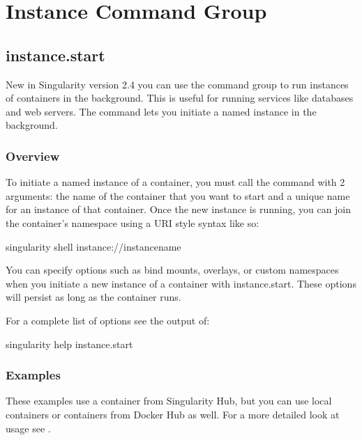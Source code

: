 \documentclass[letterpaper,10pt,english]{sphinxmanual}
\begin{document}
\section{Instance Command Group}
\label{\detokenize{appendix:instance-command-group}}\label{\detokenize{appendix:id42}}

\subsection{instance.start}
\label{\detokenize{appendix:instance-start}}\label{\detokenize{appendix:sec-instances}}\label{\detokenize{appendix:sec-instancestart}}
New in Singularity version 2.4 you can use the  command group to run
instances of containers in the background. This is useful for running
services like databases and web servers. The  command lets you initiate a
named instance in the background.


\subsubsection{Overview}
\label{\detokenize{appendix:id43}}
To initiate a named instance of a container, you must call the  command
with 2 arguments: the name of the container that you want to start and a
unique name for an instance of that container. Once the new instance is
running, you can join the container’s namespace using a URI style syntax
like so:

%
\begin{sphinxVerbatim}[commandchars=\\\{\}]
\PYGZdl{} singularity shell instance://\PYGZlt{}instance\PYGZus{}name\PYGZgt{}
\end{sphinxVerbatim}

You can specify options such as bind mounts, overlays, or custom
namespaces when you initiate a new instance of a container with
instance.start. These options will persist as long as the container
runs.

For a complete list of options see the output of:

%
\begin{sphinxVerbatim}[commandchars=\\\{\}]
singularity help instance.start
\end{sphinxVerbatim}


\subsubsection{Examples}
\label{\detokenize{appendix:id44}}
These examples use a container from Singularity Hub, but you can use
local containers or containers from Docker Hub as well. For a more
detailed look at  usage see {\hyperref[\detokenize{running_services:running-services}]{}}.
\end{document}
